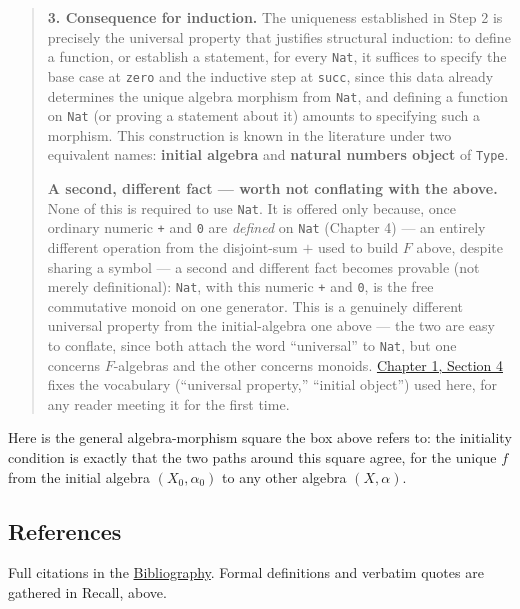 \begin{quote}
\textbf{3. Consequence for induction.} The uniqueness established in Step 2 is precisely the universal property that justifies structural induction: to define a function, or establish a statement, for every \texttt{Nat}, it suffices to specify the base case at \texttt{zero} and the inductive step at \texttt{succ}, since this data already determines the unique algebra morphism from \texttt{Nat}, and defining a function on \texttt{Nat} (or proving a statement about it) amounts to specifying such a morphism. This construction is known in the literature under two equivalent names: \textbf{initial algebra} and \textbf{natural numbers object} of \texttt{Type}.

\textbf{A second, different fact --- worth not conflating with the above.} None of this is required to use \texttt{Nat}. It is offered only because, once ordinary numeric \texttt{+} and \texttt{0} are \emph{defined} on \texttt{Nat} (Chapter 4) --- an entirely different operation from the disjoint-sum \(+\) used to build \(F\) above, despite sharing a symbol --- a second and different fact becomes provable (not merely definitional): \texttt{Nat}, with this numeric \texttt{+} and \texttt{0}, is the free commutative monoid on one generator. This is a genuinely different universal property from the initial-algebra one above --- the two are easy to conflate, since both attach the word ``universal'' to \texttt{Nat}, but one concerns \(F\)-algebras and the other concerns monoids. \hyperref[sec:01-basics:04-terminology:1]{Chapter 1, Section 4} fixes the vocabulary (``universal property,'' ``initial object'') used here, for any reader meeting it for the first time.
\end{quote}

Here is the general algebra-morphism square the box above refers to: the initiality condition is exactly that the two paths around this square agree, for the unique \(f\) from the initial algebra \((X_0, \alpha_0)\) to any other algebra \((X, \alpha)\).

\begin{center}

\end{center}

\subsection{References}\label{sec:01-basics:01-everything-has-a-type:5}

Full citations in the \hyperref[sec:root:bibliography:1]{Bibliography}. Formal definitions and verbatim quotes are gathered in Recall, above.


